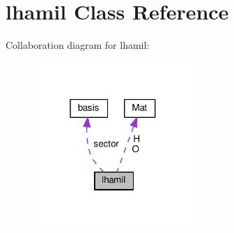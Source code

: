\hypertarget{classlhamil}{}\section{lhamil Class Reference}
\label{classlhamil}


Collaboration diagram for lhamil\+:\nopagebreak
\begin{figure}[H]
\begin{center}
\leavevmode
\includegraphics[width=172pt]{classlhamil__coll__graph}
\end{center}
\end{figure}
